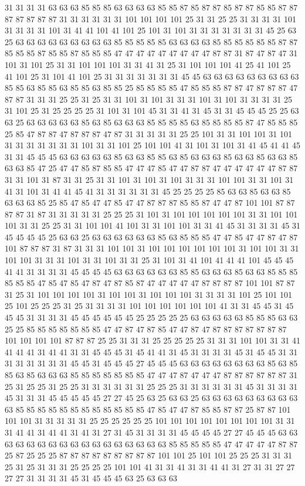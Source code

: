 31 31 31 31 63 63 63 85 85 85 63 63 63 63 85 85 87 85 87 87 85 87 87 85 85 87 87 87 87 87 87 87 31 31 31 31 31 31 101 101 101 101 25 31 31 25 25 31 31 31 31 101 31 31 31 31 101 31 41 41 101 41 101 25 101 31 101 31 31 31 31 31 31 31 45 25 63 25 63 63 63 63 63 63 63 63 63 85 85 85 85 85 63 63 63 63 85 85 85 85 85 85 87 87 85 85 85 87 85 85 87 85 85 85 47 47 47 47 47 47 47 47 47 87 87 31 87 47 87 47 31 101 31 101 25 31 31 101 101 101 31 31 41 31 25 31 101 101 101 41 25 41 101 25 41 101 25 31 101 41 101 25 31 31 31 31 31 31 31 45 45 63 63 63 63 63 63 63 63 63 85 85 63 85 85 63 85 85 63 85 85 25 85 85 85 85 47 85 85 85 87 87 47 87 87 87 47 87 87 31 31 31 25 25 31 25 31 31 101 31 101 31 31 31 101 31 101 31 31 31 31 25 31 101 25 31 25 25 25 25 31 101 31 101 45 31 31 41 31 45 31 31 45 45 45 25 25 63 63 25 63 63 63 63 63 85 63 85 63 63 63 85 85 85 85 63 85 85 85 85 87 47 85 85 85 25 85 47 87 87 47 87 87 87 47 87 31 31 31 31 31 25 25 101 31 31 101 101 31 101 31 31 31 31 31 31 31 101 31 31 101 25 101 101 41 31 101 31 101 31 41 45 41 41 45 31 31 45 45 45 63 63 63 63 63 85 63 63 85 85 63 85 63 63 63 85 63 63 85 63 63 85 63 63 85 47 25 47 47 85 87 85 85 47 47 47 85 47 47 87 87 47 47 47 47 47 47 87 87 31 31 101 31 87 31 31 25 31 31 101 31 101 31 101 31 31 31 101 101 31 31 101 31 41 31 101 31 41 41 45 41 31 31 31 31 31 31 45 25 25 25 25 85 63 63 85 63 63 85 63 63 63 85 25 85 47 85 47 47 85 47 47 87 87 87 85 85 87 47 47 87 101 101 87 87 87 87 31 87 31 31 31 31 31 25 25 25 31 101 31 101 101 101 101 101 31 31 101 101 101 31 31 25 25 31 31 101 101 41 101 31 31 101 101 31 31 41 45 31 31 31 31 45 31 45 45 45 45 25 63 63 25 63 63 63 63 63 63 85 63 85 85 85 47 47 85 47 47 87 47 87 101 87 87 87 31 87 31 31 31 101 101 31 101 101 101 101 101 101 31 101 101 31 31 101 101 31 31 31 101 31 31 101 31 31 25 31 101 31 41 101 41 41 41 101 45 45 45 41 41 31 31 31 31 45 45 45 45 63 63 63 63 63 63 85 85 63 63 63 85 63 63 85 85 85 85 85 85 47 85 47 85 47 87 47 87 85 87 47 47 47 47 47 87 87 87 87 101 101 87 87 31 25 31 101 101 101 101 31 101 101 31 101 101 101 31 31 31 31 101 25 101 101 25 101 25 25 25 31 25 31 31 31 31 101 101 101 101 101 101 41 31 31 45 45 31 45 45 45 31 31 31 31 45 45 45 45 45 45 25 25 25 25 25 63 63 63 63 63 85 85 85 63 63 25 25 85 85 85 85 85 85 85 47 47 87 47 87 85 47 47 87 47 87 87 87 87 87 87 87 101 101 101 101 87 87 87 25 25 31 31 31 25 25 25 25 25 31 31 31 101 101 31 31 41 41 41 41 31 41 41 31 31 45 45 45 31 45 41 41 31 45 31 31 31 31 45 31 45 45 31 31 31 31 31 31 31 31 45 45 31 45 45 45 27 45 45 45 63 63 63 63 63 63 63 63 85 63 85 85 63 85 63 63 63 85 85 85 85 85 85 85 47 47 47 87 47 47 47 87 87 87 87 87 87 31 25 31 25 25 31 25 25 31 31 31 31 31 31 25 25 25 31 31 31 31 31 31 45 31 31 31 31 45 31 31 31 45 45 45 45 45 27 27 45 25 63 25 63 63 25 63 63 63 63 63 63 63 63 63 63 85 85 85 85 85 85 85 85 85 85 85 85 47 85 47 47 87 85 85 87 87 25 87 87 101 101 101 31 31 31 31 31 25 25 25 25 25 25 101 101 101 101 101 101 101 101 31 31 31 41 41 31 41 41 31 41 31 27 31 45 31 31 31 31 45 45 45 45 27 27 45 45 45 63 63 63 63 63 63 63 63 63 63 63 63 63 63 63 63 63 85 85 85 85 85 47 47 47 47 47 87 87 25 87 25 25 25 87 87 87 87 87 87 87 87 87 101 101 25 101 101 25 25 25 31 31 31 25 31 25 31 31 31 25 25 25 25 101 101 41 31 31 41 31 31 41 41 31 27 31 31 27 27 27 27 31 31 31 31 45 31 45 45 45 63 25 63 63 63 